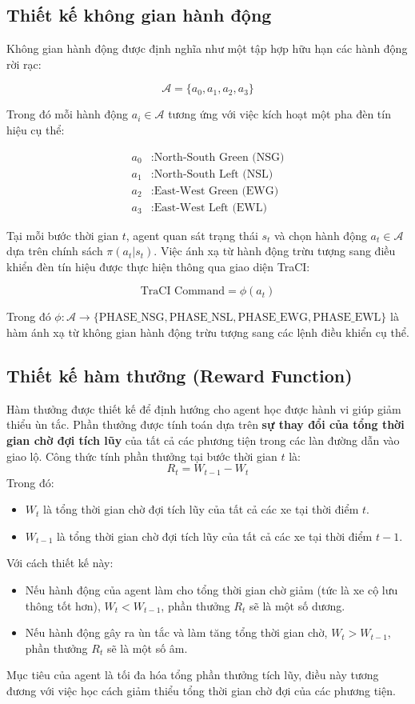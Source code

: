 \subsection{Thiết kế không gian hành động}
Không gian hành động được định nghĩa như một tập hợp hữu hạn các hành động rời rạc:

\[
    \mathcal{A} = \{a_0, a_1, a_2, a_3\}
\]

Trong đó mỗi hành động $a_i \in \mathcal{A}$ tương ứng với việc kích hoạt một pha đèn tín hiệu cụ thể:

\begin{align}
    a_0 &: \text{North-South Green (NSG)} \\
    a_1 &: \text{North-South Left (NSL)} \\
    a_2 &: \text{East-West Green (EWG)} \\
    a_3 &: \text{East-West Left (EWL)}
\end{align}

Tại mỗi bước thời gian $t$, agent quan sát trạng thái $s_t$ và chọn hành động $a_t \in \mathcal{A}$ dựa trên chính sách $\pi(a_t|s_t)$. Việc ánh xạ từ hành động trừu tượng sang điều khiển đèn tín hiệu được thực hiện thông qua giao diện TraCI:

\[
    \text{TraCI Command} = \phi(a_t)
\]

Trong đó $\phi: \mathcal{A} \rightarrow \{\text{PHASE\_NSG}, \text{PHASE\_NSL}, \text{PHASE\_EWG}, \text{PHASE\_EWL}\}$ là hàm ánh xạ từ không gian hành động trừu tượng sang các lệnh điều khiển cụ thể.

\subsection{Thiết kế hàm thưởng (Reward Function)}
Hàm thưởng được thiết kế để định hướng cho agent học được hành vi giúp giảm thiểu ùn tắc. Phần thưởng được tính toán dựa trên \textbf{sự thay đổi của tổng thời gian chờ đợi tích lũy} của tất cả các phương tiện trong các làn đường dẫn vào giao lộ. Công thức tính phần thưởng tại bước thời gian $t$ là:
\[
    R_{t} = W_{t-1}- W_{t}
\]
Trong đó:
\begin{itemize}
    \item $W_{t}$ là tổng thời gian chờ đợi tích lũy của tất cả các xe tại thời điểm
        $t$.

    \item $W_{t-1}$ là tổng thời gian chờ đợi tích lũy của tất cả các xe tại thời
        điểm $t-1$.
\end{itemize}
Với cách thiết kế này:
\begin{itemize}
    \item Nếu hành động của agent làm cho tổng thời gian chờ giảm (tức là xe cộ
        lưu thông tốt hơn), $W_{t} < W_{t-1}$, phần thưởng $R_{t}$ sẽ là một số dương.

    \item Nếu hành động gây ra ùn tắc và làm tăng tổng thời gian chờ,
        $W_{t} > W_{t-1}$, phần thưởng $R_{t}$ sẽ là một số âm.
\end{itemize}
Mục tiêu của agent là tối đa hóa tổng phần thưởng tích lũy, điều này tương đương với việc học cách giảm thiểu tổng thời gian chờ đợi của các phương tiện.

